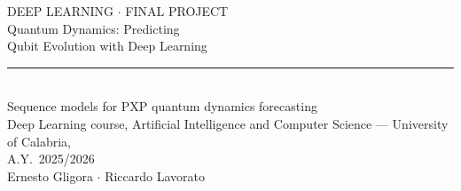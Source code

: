 \documentclass[aspectratio=169,10pt]{beamer}
\begin{document}
\begin{frame}[plain]
    \vspace{1.25cm}
    {\fontsize{8}{10}\selectfont\color{accentbronze}\MakeUppercase{Deep Learning $\cdot$ Final Project}}\\[0.45cm]
    {\rmfamily\fontsize{25}{31}\selectfont\color{textdark}Quantum Dynamics: Predicting\\Qubit Evolution with Deep Learning}\\[0.45cm]
    {\color{accentbronze}\rule{4.5cm}{0.7pt}}\\[0.35cm]
    {\fontsize{11.5}{15}\selectfont\color{textdark}Sequence models for PXP quantum dynamics forecasting}\\[0.45cm]
    {\fontsize{8.5}{11.5}\selectfont\color{textmuted}Deep Learning course, Artificial Intelligence and Computer Science --- University of Calabria,\\A.Y.\ 2025/2026}\\[0.45cm]
    {\fontsize{10.5}{13}\selectfont\color{textdark}Ernesto Gligora $\cdot$ Riccardo Lavorato}
\end{frame}
\end{document}
